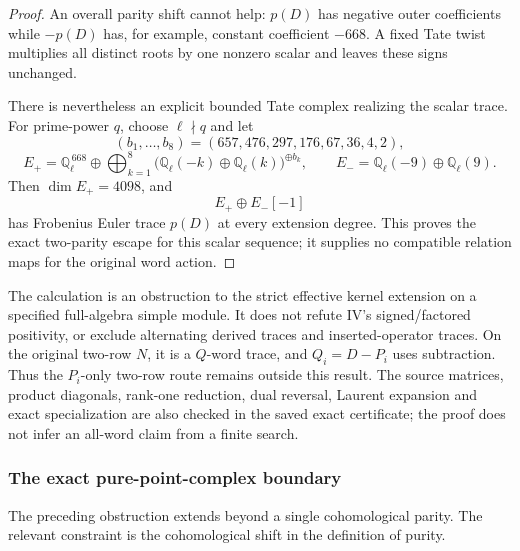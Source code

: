 \documentclass[11pt,a4paper]{article}
\theoremstyle{named}\newtheorem{finding}{Finding}[section]
\theoremstyle{definition}\newtheorem{definition}[finding]{Definition}
\theoremstyle{remark}\newtheorem{remark}[finding]{Remark}
\begin{document}
\begin{proof}
An overall parity shift cannot help:
\(p(D)\) has negative outer coefficients while
\(-p(D)\) has, for example, constant coefficient \(-668\).
A fixed Tate twist multiplies all distinct roots by one
nonzero scalar and leaves these signs unchanged.

There is nevertheless an explicit bounded Tate complex
realizing the scalar trace. For prime-power \(q\), choose
\(\ell\nmid q\) and let
\[
 (b_1,\ldots,b_8)=(657,476,297,176,67,36,4,2),
\]
\[
 E_+=\mathbb Q_\ell^{\,668}
   \oplus\bigoplus_{k=1}^{8}
      \big(\mathbb Q_\ell(-k)\oplus
           \mathbb Q_\ell(k)\big)^{\oplus b_k},
 \qquad
 E_-=\mathbb Q_\ell(-9)\oplus\mathbb Q_\ell(9).
\]
Then \(\dim E_+=4098\), and
\[
 E_+\oplus E_-[-1]
\]
has Frobenius Euler trace \(p(D)\) at every extension degree.
This proves the exact two-parity escape for this scalar
sequence; it supplies no compatible relation maps for
the original word action.
\end{proof}

The calculation is an obstruction to the strict effective
kernel extension on a specified full-algebra simple module.
It does not refute IV's signed/factored positivity, or
exclude alternating derived traces and inserted-operator
traces. On the original two-row \(N\), it is a \(Q\)-word
trace, and \(Q_i=D-P_i\) uses subtraction. Thus the
\(P_i\)-only two-row route remains outside this result.
The source matrices, product diagonals, rank-one reduction,
dual reversal, Laurent expansion and exact specialization
are also checked in the saved exact certificate; the proof
does not infer an all-word claim from a finite search.

\subsubsection{The exact pure-point-complex boundary}

The preceding obstruction extends beyond a single cohomological
parity. The relevant constraint is the cohomological shift in the
definition of purity.
\end{document}
